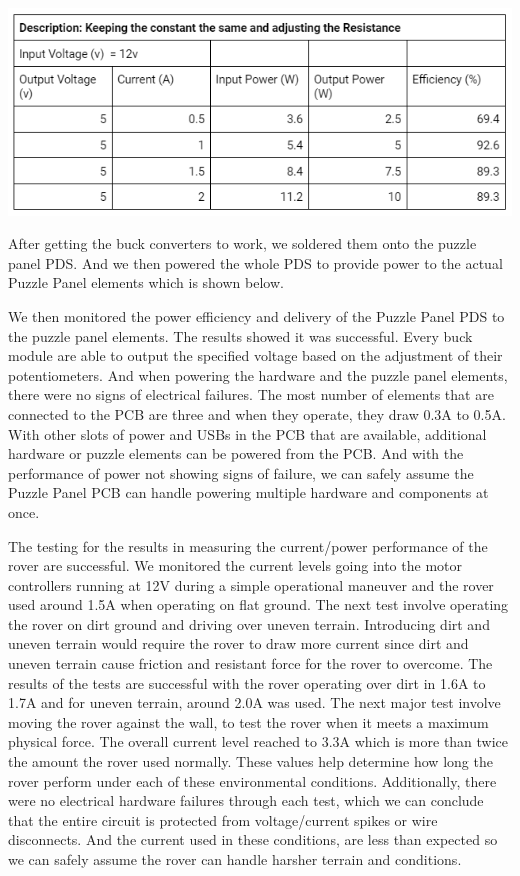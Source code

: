 \documentclass[a4paper, 10pt]{article}
\begin{document}
\includegraphics[scale=1.0]{Photos/Buck Converter Data}

	After getting the buck converters to work, we soldered them onto the puzzle panel PDS. And we then powered the whole PDS to provide power to the actual Puzzle Panel elements which is shown below. 


	We then monitored the power efficiency and delivery of the Puzzle Panel PDS to the puzzle panel elements. The results showed it was successful. Every buck module are able to output the specified voltage based on the adjustment of their potentiometers. And when powering the hardware and the puzzle panel elements, there were no signs of electrical failures. The most number of elements that are connected to the PCB are three and when they operate, they draw 0.3A to 0.5A. With other slots of power and USBs in the PCB that are available, additional hardware or puzzle elements can be powered from the PCB. And with the performance of power not showing signs of failure, we can safely assume the Puzzle Panel PCB can handle powering multiple hardware and components at once.

	The testing for the results in measuring the current/power performance of the rover are successful. We monitored the current levels going into the motor controllers running at 12V during a simple operational maneuver and the rover used around 1.5A when operating on flat ground. The next test involve operating the rover on dirt ground and driving over uneven terrain. Introducing dirt and uneven terrain would require the rover to draw more current since dirt and uneven terrain cause friction and resistant force for the rover to overcome. The results of the tests are successful with the rover operating over dirt in 1.6A to 1.7A and for uneven terrain, around 2.0A was used. The next major test involve moving the rover against the wall, to test the rover when it meets a maximum physical force. The overall current level reached to 3.3A which is more than twice the amount the rover used normally. These values help determine how long the rover perform under each of these environmental conditions. Additionally, there were no electrical hardware failures through each test, which we can conclude that the entire circuit is protected from voltage/current spikes or wire disconnects. And the current used in these conditions, are less than expected so we can safely assume the rover can handle harsher terrain and conditions.
\end{document}
